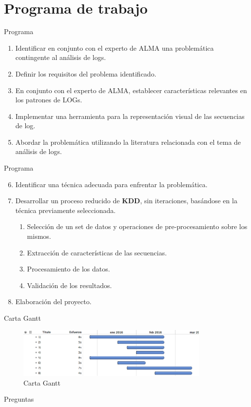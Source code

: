 \documentclass[11pt]{beamer}
\begin{document}
\section{Programa de trabajo}
\begin{frame}{Programa}
	\begin{enumerate}
	\item Identificar en conjunto con el experto de ALMA una problemática contingente al análisis de logs.

	\item Definir los requisitos del problema identificado.

	\item En conjunto con el experto de ALMA, establecer características relevantes en los patrones de LOGs.
	
	\item Implementar una herramienta para la representación visual de las secuencias de log.

	\item Abordar la problemática utilizando la literatura relacionada con el tema de análisis de logs.
	
\end{enumerate}

\end{frame}
\begin{frame}{Programa}
	\begin{enumerate}
	 \setcounter{enumi}{5}

	\item Identificar una técnica adecuada para enfrentar la problemática.
	
	\item Desarrollar un proceso reducido de \textbf{KDD}, sin iteraciones, basándose en la técnica previamente seleccionada.
	\begin{enumerate}
		\item Selección de un set de datos y operaciones de pre-procesamiento sobre los mismos.
		\item Extracción de características de las secuencias.
		\item Procesamiento de los datos.
		\item Validación de los resultados.
	\end{enumerate}
	\item Elaboración del proyecto.
\end{enumerate}
\end{frame}

\begin{frame}{Carta Gantt}
	\begin{figure}
		\centering
		\includegraphics[height=2.5cm]{gantt}
		\caption{Carta Gantt}
	\end{figure}
\end{frame}

\begin{frame}{Preguntas}
\titlepage
\end{frame}
\end{document}
